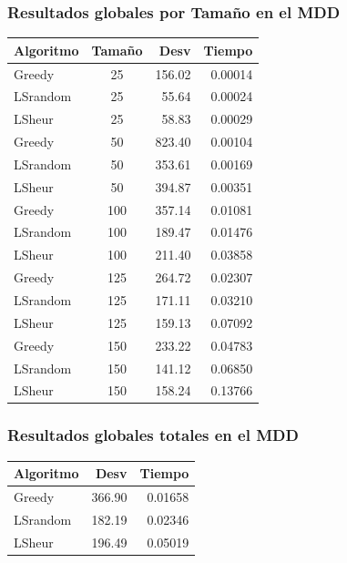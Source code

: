 \documentclass{article}
\begin{document}
\subsubsection{Resultados globales por Tamaño en el MDD}

\begin{table}[ht]
\centering
\begin{tabular}{|l|c|r|r|}
\hline
\textbf{Algoritmo} & \textbf{Tamaño} & \textbf{Desv} & \textbf{Tiempo} \\ \hline
Greedy & 25 & 156.02 & 0.00014 \\ \hline
LSrandom & 25 & 55.64 & 0.00024 \\ \hline
LSheur & 25 & 58.83 & 0.00029 \\ \hline
Greedy & 50 & 823.40 & 0.00104 \\ \hline
LSrandom & 50 & 353.61 & 0.00169 \\ \hline
LSheur & 50 & 394.87 & 0.00351 \\ \hline
Greedy & 100 & 357.14 & 0.01081 \\ \hline
LSrandom & 100 & 189.47 & 0.01476 \\ \hline
LSheur & 100 & 211.40 & 0.03858 \\ \hline
Greedy & 125 & 264.72 & 0.02307 \\ \hline
LSrandom & 125 & 171.11 & 0.03210 \\ \hline
LSheur & 125 & 159.13 & 0.07092 \\ \hline
Greedy & 150 & 233.22 & 0.04783 \\ \hline
LSrandom & 150 & 141.12 & 0.06850 \\ \hline
LSheur & 150 & 158.24 & 0.13766 \\ \hline
\end{tabular}
\end{table}

\subsubsection{Resultados globales totales en el MDD}

\begin{table}[ht]
\centering
\begin{tabular}{|l|r|r|}
\hline
\textbf{Algoritmo} & \textbf{Desv} & \textbf{Tiempo} \\ \hline
Greedy & 366.90 & 0.01658 \\ \hline
LSrandom & 182.19 & 0.02346 \\ \hline
LSheur & 196.49 & 0.05019 \\ \hline
\end{tabular}
\end{table}
\end{document}
